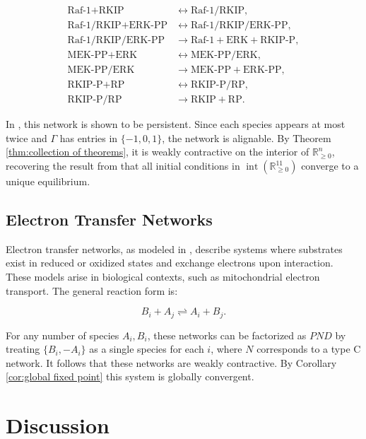 \documentclass{article}
\begin{document}
\begin{align}
    \mbox{Raf-1} + \mbox{RKIP} &\leftrightarrow \mbox{Raf-1/RKIP},\\
    \mbox{Raf-1/RKIP} + \mbox{ERK-PP} &\leftrightarrow \mbox{Raf-1/RKIP/ERK-PP}, \\
    \mbox{Raf-1/RKIP/ERK-PP} &\rightarrow \mbox{Raf-1} + \mbox{ERK} + \mbox{RKIP-P}, \\
    \mbox{MEK-PP} + \mbox{ERK} &\leftrightarrow \mbox{MEK-PP/ERK}, \\
    \mbox{MEK-PP/ERK} &\rightarrow \mbox{MEK-PP} + \mbox{ERK-PP}, \\
    \mbox{RKIP-P} + \mbox{RP} &\leftrightarrow \mbox{RKIP-P/RP}, \\
    \mbox{RKIP-P/RP} &\rightarrow \mbox{RKIP} + \mbox{RP}.
\end{align}

In \cite{Angeli2010-hj}, this network is shown to be persistent. Since each species appears at most twice and \( \Gamma \) has entries in \( \{-1,0,1\} \), the network is alignable. By Theorem \ref{thm:collection of theorems}, it is weakly contractive on the interior of \( \mathbb{R}^n_{\geq 0} \), recovering the result from \cite{Angeli2010-hj} that all initial conditions in \( \operatorname{int}(\mathbb{R}_{\geq 0}^{11}) \) converge to a unique equilibrium.


\subsection{Electron Transfer Networks}

Electron transfer networks, as modeled in \cite{article}, describe systems where substrates exist in reduced or oxidized states and exchange electrons upon interaction. These models arise in biological contexts, such as mitochondrial electron transport. The general reaction form is:

\[
B_i + A_j \rightleftharpoons A_i + B_j.
\]

For any number of species \( A_i, B_i \), these networks can be factorized as \( PND \) by treating \( \{B_i, -A_i\} \) as a single species for each \( i \), where \( N \) corresponds to a type C network. It follows that these networks are weakly contractive. By Corollary \ref{cor:global fixed point} this system is globally convergent.




\section{Discussion}
\end{document}
